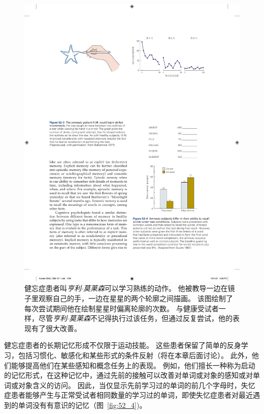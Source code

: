 \begin{figure}[htbp]
	\centering
	\includegraphics[width=1.0\linewidth]{chap52/fig_52_3}
	\caption{健忘症患者叫\textit{亨利$\cdot$莫莱森}可以学习熟练的动作。
		他被教导一边在镜子里观察自己的手，一边在星星的两个轮廓之间描画。
		该图绘制了每次尝试期间他在绘制星星时偏离轮廓的次数。
		与健康受试者一样，尽管\textit{亨利$\cdot$莫莱森}不记得执行过该任务，但通过反复尝试，他的表现有了很大改善\cite{blakemore1977mechanics}。}
	\label{fig:52_3}
\end{figure}


健忘症患者的长期记忆形成不仅限于运动技能。
这些患者保留了简单的反身学习，包括习惯化、敏感化和某些形式的条件反射（将在本章后面讨论）。
此外，他们能够提高他们在某些感知和概念任务上的表现。
例如，他们擅长一种称为启动的记忆形式，在这种记忆中，通过先前的接触可以改善对单词或对象的感知或对单词或对象含义的访问。
因此，当仅显示先前学习过的单词的前几个字母时，失忆症患者能够产生与正常受试者相同数量的学习过的单词，即使失忆症患者对最近遇到的单词没有有意识的记忆（图~\ref{fig:52_4})。


